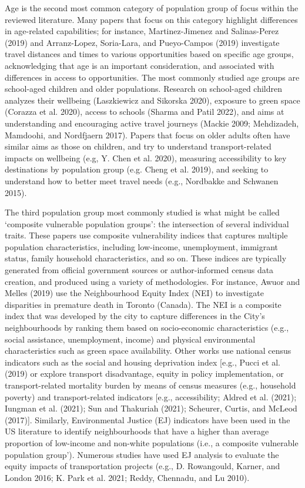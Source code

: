 \documentclass[12pt, oneside]{report}
\begin{document}
Age is the second most common category of population group of focus
within the reviewed literature. Many papers that focus on this category
highlight differences in age-related capabilities; for instance,
Martinez-Jimenez and Salinas-Perez (2019) and Arranz-Lopez, Soria-Lara,
and Pueyo-Campos (2019) investigate travel distances and times to
various opportunities based on specific age groups, acknowledging that
age is an important consideration, and associated with differences in
access to opportunities. The most commonly studied age groups are
school-aged children and older populations. Research on school-aged
children analyzes their wellbeing (Laszkiewicz and Sikorska 2020),
exposure to green space (Corazza et al. 2020), access to schools (Sharma
and Patil 2022), and aims at understanding and encouraging active travel
journeys (Mackie 2009; Mehdizadeh, Mamdoohi, and Nordfjaern 2017).
Papers that focus on older adults often have similar aims as those on
children, and try to understand transport-related impacts on wellbeing
(e.g, Y. Chen et al. 2020), measuring accessibility to key destinations
by population group (e.g. Cheng et al. 2019), and seeking to understand
how to better meet travel needs (e.g., Nordbakke and Schwanen 2015).

The third population group most commonly studied is what might be called
`composite vulnerable population groups': the intersection of several
individual traits. These papers use composite vulnerability indices that
captures multiple population characteristics, including low-income,
unemployment, immigrant status, family household characteristics, and so
on. These indices are typically generated from official government
sources or author-informed census data creation, and produced using a
variety of methodologies. For instance, Awuor and Melles (2019) use the
Neighbourhood Equity Index (NEI) to investigate disparities in premature
death in Toronto (Canada). The NEI is a composite index that was
developed by the city to capture differences in the City's
neighbourhoods by ranking them based on socio-economic characteristics
(e.g., social assistance, unemployment, income) and physical
environmental characteristics such as green space availability. Other
works use national census indicators such as the social and housing
deprivation index {[}e.g., Pucci et al. (2019) or explore transport
disadvantage, equity in policy implementation, or transport-related
mortality burden by means of census measures (e.g., household poverty)
and transport-related indicators {[}e.g., accessibility; Aldred et al.
(2021); Iungman et al. (2021); Sun and Thakuriah (2021); Scheurer,
Curtis, and McLeod (2017){]}. Similarly, Environmental Justice (EJ)
indicators have been used in the US literature to identify
neighbourhoods that have a higher than average proportion of low-income
and non-white populations (i.e., a composite vulnerable population
group'). Numerous studies have used EJ analysis to evaluate the equity
impacts of transportation projects (e.g., D. Rowangould, Karner, and
London 2016; K. Park et al. 2021; Reddy, Chennadu, and Lu 2010).
\end{document}
